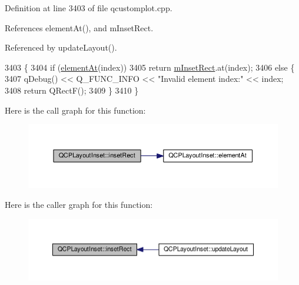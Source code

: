 Definition at line 3403 of file qcustomplot.\+cpp.



References element\+At(), and m\+Inset\+Rect.



Referenced by update\+Layout().


\begin{DoxyCode}
3403                                                 \{
3404   \textcolor{keywordflow}{if} (\hyperlink{class_q_c_p_layout_inset_ab096d07b08f9b5455647f3ba7ff60e27}{elementAt}(index))
3405     \textcolor{keywordflow}{return} \hyperlink{class_q_c_p_layout_inset_aaa8f6b5029458f3d97a65239524a2b33}{mInsetRect}.at(index);
3406   \textcolor{keywordflow}{else} \{
3407     qDebug() << Q\_FUNC\_INFO << \textcolor{stringliteral}{"Invalid element index:"} << index;
3408     \textcolor{keywordflow}{return} QRectF();
3409   \}
3410 \}
\end{DoxyCode}


Here is the call graph for this function\+:\nopagebreak
\begin{figure}[H]
\begin{center}
\leavevmode
\includegraphics[width=350pt]{class_q_c_p_layout_inset_a5ec7037b3b8d20fbf9560e01779b1442_cgraph}
\end{center}
\end{figure}




Here is the caller graph for this function\+:\nopagebreak
\begin{figure}[H]
\begin{center}
\leavevmode
\includegraphics[width=350pt]{class_q_c_p_layout_inset_a5ec7037b3b8d20fbf9560e01779b1442_icgraph}
\end{center}
\end{figure}


\hypertarget{class_q_c_p_layout_inset_ab5a2f2b88c05e369fd7da9583d17aa3a}{}
